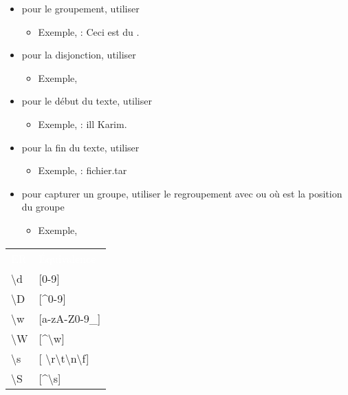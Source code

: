 \documentclass{KodeBook}
\begin{document}
\begin{minipage}{.6\textwidth}
	\begin{itemize}
		\item pour le groupement, utiliser \keyword{( )}
		\begin{itemize}
			\item Exemple,  : Ceci est du .
		\end{itemize}
		\item pour la disjonction, utiliser \keyword{\textbar}
		\begin{itemize}
			\item Exemple, 
		\end{itemize}
		\item pour le début du texte, utiliser \keyword{\textasciicircum}
		\begin{itemize}
			\item Exemple,  :  ill Karim.
		\end{itemize}
		\item pour la fin du texte, utiliser \keyword{\$}
		\begin{itemize}
			\item Exemple,  :  fichier.tar
		\end{itemize}
		\item pour capturer un groupe, utiliser le regroupement avec  ou  où  est la position du groupe
		\begin{itemize}
			\item Exemple, 
		\end{itemize}
	\end{itemize}
\end{minipage}
\begin{minipage}{.38\textwidth}
	\begin{tabular}{p{}p{}}
		\rowcolor{darkblue}
		\textcolor{white}{ER} & \textcolor{white}{Équivalence} \\
		
		\textbackslash d & [0-9] \\
		\textbackslash D & [\textasciicircum 0-9] \\
		\textbackslash w & [a-zA-Z0-9\_] \\
		\textbackslash W & [\textasciicircum \textbackslash w] \\
		\textbackslash s & [ \textbackslash r\textbackslash t\textbackslash n\textbackslash f] \\
		\textbackslash S & [\textasciicircum \textbackslash s] \\
	\end{tabular}
	
\end{minipage}
\end{document}
